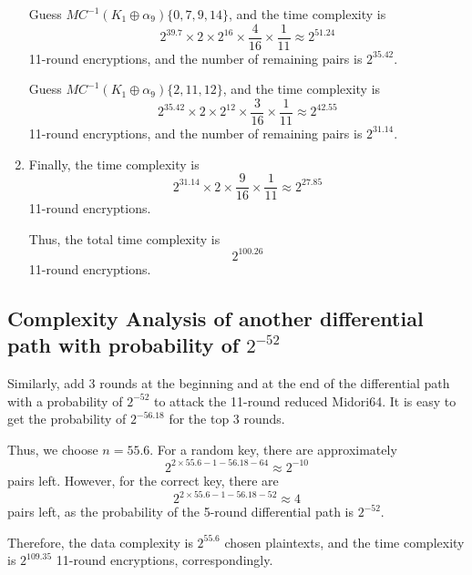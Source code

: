 \documentclass{article}
\begin{document}
\begin{enumerate}
    Guess $MC^{-1}(K_1 \oplus \alpha_9)\{0, 7, 9, 14\}$, and the time complexity is  
    \[
    2^{39.7} \times 2 \times 2^{16} \times \frac{4}{16} \times \frac{1}{11} \approx 2^{51.24}
    \]  
    11-round encryptions, and the number of remaining pairs is $2^{35.42}$.  

    Guess $MC^{-1}(K_1 \oplus \alpha_9)\{2, 11, 12\}$, and the time complexity is  
    \[
    2^{35.42} \times 2 \times 2^{12} \times \frac{3}{16} \times \frac{1}{11} \approx 2^{42.55}
    \]  
    11-round encryptions, and the number of remaining pairs is $2^{31.14}$.

    \item Finally, the time complexity is  
    \[
    2^{31.14} \times 2 \times \frac{9}{16} \times \frac{1}{11} \approx 2^{27.85}
    \]  
    11-round encryptions.  

    Thus, the total time complexity is  
    \[
    2^{100.26}
    \]  
    11-round encryptions.
\end{enumerate}


\subsection{Complexity Analysis of another differential path with probability of $2^{-52}$}

Similarly, add 3 rounds at the beginning and at the end of the differential path with a probability of $2^{-52}$ to attack the 11-round reduced Midori64. It is easy to get the probability of $2^{-56.18}$ for the top 3 rounds. 

Thus, we choose $n = 55.6$. For a random key, there are approximately  
\[
2^{2 \times 55.6 - 1 - 56.18 - 64} \approx 2^{-10}
\]  
pairs left. However, for the correct key, there are  
\[
2^{2 \times 55.6 - 1 - 56.18 - 52} \approx 4
\]  
pairs left, as the probability of the 5-round differential path is $2^{-52}$. 

Therefore, the data complexity is $2^{55.6}$ chosen plaintexts, and the time complexity is $2^{109.35}$ 11-round encryptions, correspondingly.
\end{document}
